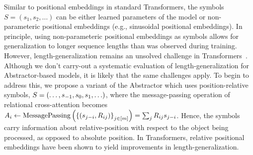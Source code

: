 \begin{remark}\rm
    Similar to positional embeddings in standard Transformers, the symbols $S = (s_1, s_2, \ldots)$ can be either learned parameters of the model or non-parameteric positional embeddings (e.g., sinusoidal positional embeddings). In principle, using non-parameteric positional embeddings as symbols allows for generalization to longer sequence lengths than was observed during training. However, length-generalization remains an unsolved challenge in Transformers~\citep{kazemnejadImpactPositionalEncoding2023}. Although we don't carry-out a systematic evaluation of length-generalization for Abstractor-based models, it is likely that the same challenges apply. To begin to address this, we propose a variant of the Abstractor which uses position-relative symbols, $S = \left(\ldots, s_{-1}, s_0, s_1, \ldots\right)$, where the message-passing operation of relational cross-attention becomes $A_i \gets \mathrm{MessagePassing}\left(\left\{(s_{j-i}, R_{ij})\right\}_{j \in [m]}\right) = \sum_{j} R_{ij} s_{j-i}$.
    Hence, the symbols carry information about relative-position with respect to the object being processed, as opposed to absolute position. In Transformers, relative positional embeddings have been shown to yield improvements in length-generalization.
\end{remark}

%